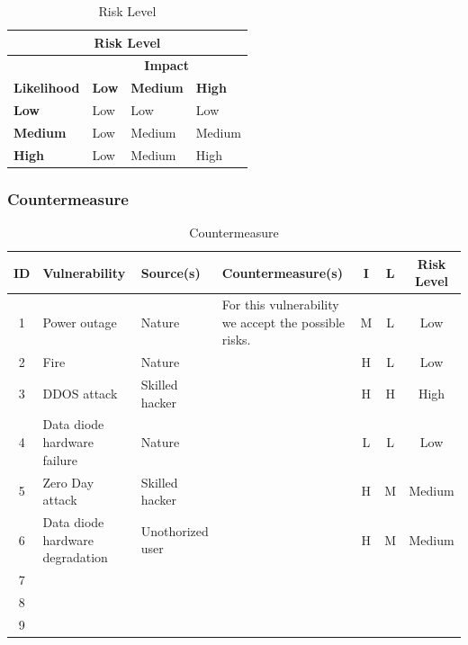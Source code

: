 \documentclass[a4paper,10pt]{article}
\begin{document}
\begin{table}[!h]
	\centering
	\begin{tabular}{|l|l|l|l|}
		\hline
		\multicolumn{4}{|c|}{\textbf{Risk Level}} \\
		\hline
		 & \multicolumn{3}{|c|}{\textbf{Impact}}  \\ \hline
		\textbf{Likelihood} & \textbf{Low} & \textbf{Medium} & \textbf{High} \\ \hline
		\textbf{Low}& Low & Low & Low \\ \hline
		\textbf{Medium} & Low & Medium & Medium \\ \hline
		\textbf{High} & Low & Medium & High \\ \hline
	\end{tabular}
	\caption{Risk Level}
	\label{table:RL}
\end{table}

\subsubsection{Countermeasure}


\begin{table}[!h]
	\centering
	\begin{tabular}{|c|p{}|p{2.5cm}|p{6.5cm}|c|c|c|}
		\hline
		\textbf{ID}& \textbf{Vulnerability} & \textbf{Source(s)} & \textbf{Countermeasure(s)} & \textbf{I} & \textbf{L} & \textbf{Risk Level}          \\
		\hline
		1 & Power outage  & Nature & For this vulnerability we accept the possible risks. & M & L & Low \\
		\hline
		2 & Fire & Nature & & H & L & Low \\
		\hline
		3 & DDOS attack & Skilled hacker & & H & H & High \\
		\hline
		4 & Data diode hardware failure & Nature & & L & L & Low \\
		\hline
		5 & Zero Day attack & Skilled hacker & & H & M & Medium \\
		\hline
		6 & Data diode hardware degradation & Unothorized user & & H & M & Medium  \\
		\hline
		7 & & & & & & \\
		\hline
		8 & & & & & & \\
		\hline
		9 & & & & & & \\
		\hline
	\end{tabular}
	\caption{Countermeasure}
\end{table}
\end{document}
